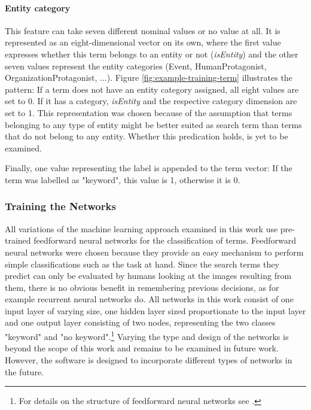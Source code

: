 \documentclass[11pt,a4paper,twoside]{article}
\begin{document}
\paragraph{Entity category} This feature can take seven different nominal values or no value at all. It is represented as an eight-dimensional vector on its own, where the first value expresses whether this term belongs to an entity or not (\emph{isEntity}) and the other seven values represent the entity categories (Event, HumanProtagonist, OrganizationProtagonist, ...). Figure \ref{fig:example-training-term} illustrates the pattern: If a term does not have an entity category assigned, all eight values are set to 0. If it has a category, \emph{isEntity} and the respective category dimension are set to 1. This representation was chosen because of the assumption that terms belonging to any type of entity might be better suited as search term than terms that do not belong to any entity. Whether this predication holds, is yet to be examined. 

\bigskip

\noindent Finally, one value representing the label is appended to the term vector: If the term was labelled as "keyword", this value is 1, otherwise it is 0.

\subsubsection{Training the Networks} \label{SystemTrainTrain}

\noindent All variations of the machine learning approach examined in this work use pre-trained feedforward neural networks for the classification of terms. Feedforward neural networks were chosen because they provide an easy mechanism to perform simple classifications such as the task at hand. Since the search terms they predict can only be evaluated by humans looking at the images resulting from them, there is no obvious benefit in remembering previous decisions, as for example recurrent neural networks do. All networks in this work consist of one input layer of varying size, one hidden layer sized proportionate to the input layer and one output layer consisting of two nodes, representing the two classes "keyword" and "no keyword".\footnote{For details on the structure of feedforward neural networks see \cite{Bishop1995NeuralRecognition}.} Varying the type and design of the networks is beyond the scope of this work and remains to be examined in future work. However, the software is designed to incorporate different types of networks in the future.
\end{document}
